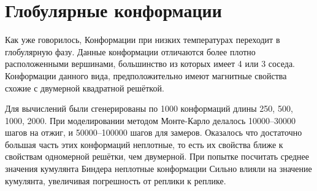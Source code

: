 \section{Глобулярные конформации}
Как уже говорилось, Конформации при низких температурах переходит в глобулярную фазу. Данные конформации отличаются более плотно расположенными вершинами, большинство из которых имеет 4 или 3 соседа. Конформации данного вида, предположительно имеют магнитные свойства схожие с двумерной квадратной решёткой. 

Для вычислений были сгенерированы по 1000 конформаций длины 250, 500, 1000, 2000. При моделировании методом Монте-Карло делалось 10000--30000 шагов на отжиг, и 50000--100000 шагов для замеров. 
Оказалось что достаточно большая часть этих конформаций неплотные, то есть их свойства ближе к свойствам одномерной решётки, чем двумерной. При попытке посчитать среднее значения кумулянта Биндера неплотные конформации Сильно влияли на значение кумулянта, увеличивая погрешность от реплики к реплике.

